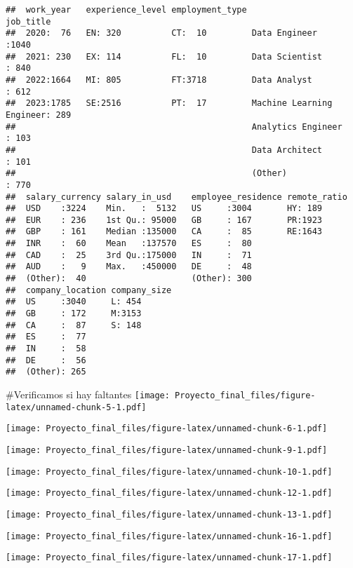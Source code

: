 \documentclass[
]{article}
\begin{document}
\begin{verbatim}
##  work_year   experience_level employment_type                     job_title   
##  2020:  76   EN: 320          CT:  10         Data Engineer            :1040  
##  2021: 230   EX: 114          FL:  10         Data Scientist           : 840  
##  2022:1664   MI: 805          FT:3718         Data Analyst             : 612  
##  2023:1785   SE:2516          PT:  17         Machine Learning Engineer: 289  
##                                               Analytics Engineer       : 103  
##                                               Data Architect           : 101  
##                                               (Other)                  : 770  
##  salary_currency salary_in_usd    employee_residence remote_ratio
##  USD    :3224    Min.   :  5132   US     :3004       HY: 189     
##  EUR    : 236    1st Qu.: 95000   GB     : 167       PR:1923     
##  GBP    : 161    Median :135000   CA     :  85       RE:1643     
##  INR    :  60    Mean   :137570   ES     :  80                   
##  CAD    :  25    3rd Qu.:175000   IN     :  71                   
##  AUD    :   9    Max.   :450000   DE     :  48                   
##  (Other):  40                     (Other): 300                   
##  company_location company_size
##  US     :3040     L: 454      
##  GB     : 172     M:3153      
##  CA     :  87     S: 148      
##  ES     :  77                 
##  IN     :  58                 
##  DE     :  56                 
##  (Other): 265
\end{verbatim}

\#Verificamos si hay faltantes
\texttt{[image: Proyecto\_final\_files/figure-latex/unnamed-chunk-5-1.pdf]}

\texttt{[image: Proyecto\_final\_files/figure-latex/unnamed-chunk-6-1.pdf]}

\texttt{[image: Proyecto\_final\_files/figure-latex/unnamed-chunk-9-1.pdf]}

\texttt{[image: Proyecto\_final\_files/figure-latex/unnamed-chunk-10-1.pdf]}

\texttt{[image: Proyecto\_final\_files/figure-latex/unnamed-chunk-12-1.pdf]}

\texttt{[image: Proyecto\_final\_files/figure-latex/unnamed-chunk-13-1.pdf]}

\texttt{[image: Proyecto\_final\_files/figure-latex/unnamed-chunk-16-1.pdf]}

\texttt{[image: Proyecto\_final\_files/figure-latex/unnamed-chunk-17-1.pdf]}
\end{document}
